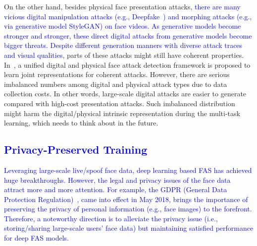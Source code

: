 \documentclass[10pt,journal,compsoc]{IEEEtran}
\begin{document}
On the other hand, besides physical face presentation attacks, \textcolor{blue}{there are many vicious digital manipulation attacks (e.g., Deepfake~\cite{ciftci2020fakecatcher}) and morphing attacks (e.g., via generative model StyleGAN\cite{sarkar2022gan}) on face videos. As generative models become stronger and stronger, these direct digital attacks from generative models become bigger threats. Despite different generation manners with diverse attack traces and visual qualities}, parts of these attacks might still have coherent properties. In~\cite{deb2021unified}, a unified digital and physical face attack detection framework is proposed to learn joint representations for coherent attacks. However, there are serious imbalanced numbers among digital and physical attack types due to data collection costs. In other words, large-scale digital attacks are easier to generate compared with high-cost presentation attacks. Such imbalanced distribution might harm the digital/physical intrinsic representation during the multi-task learning, which needs to think about in the future. 




\vspace{-0.5em}
\subsection{ \textcolor{blue}{Privacy-Preserved Training}}

 \textcolor{blue}{Leveraging large-scale live/spoof face data, deep learning based FAS has achieved huge breakthroughs. However, the legal and privacy issues of the face data attract more and more attention. For example, the GDPR (General Data Protection Regulation)~\cite{voigt2017eu}, came into effect in May 2018, brings the importance of preserving the privacy of personal information (e.g., face images) to the forefront. Therefore, a noteworthy direction is to alleviate the privacy issue (i.e., storing/sharing large-scale users' face data) but maintaining satisfied performance for deep FAS models.} 
\end{document}
